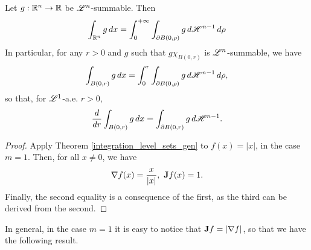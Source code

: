 \begin{theorem} \label{polar_coordinates}
Let $g : \mathbb{R}^{n} \to \mathbb{R}$ be $\mathscr{L}^{n}$-summable. Then
\begin{equation*} 
\int_{\mathbb{R}^{n}} g \, dx = \int_{0}^{+\infty} \int_{\partial B(0, \rho)} g \, d \mathscr{H}^{n - 1} \, d \rho
\end{equation*}
In particular, for any $r > 0$ and $g$ such that $g \chi_{B(0, r)}$ is $\mathscr{L}^{n}$-summable, we have
\begin{equation*}
\int_{B(0, r)} g \, dx = \int_{0}^{r} \int_{\partial B(0, \rho)} g \, d \mathscr{H}^{n - 1} \, d \rho,
\end{equation*}
so that, for $\mathscr{L}^{1}$-a.e. $r > 0$,
\begin{equation*}
\frac{d}{dr} \int_{B(0, r)} g \, dx = \int_{\partial B(0, r)} g \, d \mathscr{H}^{n - 1}.
\end{equation*}
\end{theorem}
\begin{proof}
Apply Theorem \ref{integration_level_sets_gen} to $f(x) = |x|$, in the case $m = 1$. Then, for all $x \neq 0$, we have $$\nabla f(x) = \frac{x}{|x|}, \ {\bf J} f(x) = 1.$$
Finally, the second equality is a consequence of the first, as the third can be derived from the second.
\end{proof}

In general, in the case $m = 1$ it is easy to notice that ${\bf J} f = |\nabla f|$, so that we have the following result.

